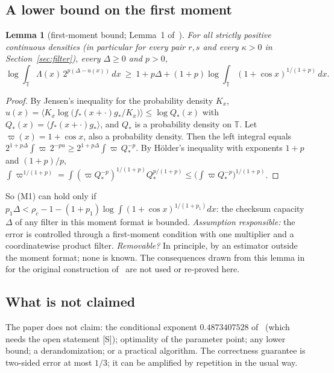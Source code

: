 \documentclass[11pt]{article}
\newtheorem{lemma}{Lemma}[section]
\theoremstyle{definition}
\newcommand{\Tc}{\mathbb T}
\newcommand{\av}[1]{\langle #1\rangle}
\begin{document}
\subsection{A lower bound on the first moment}
\begin{lemma}[first-moment bound; Lemma~1 of~\cite{V}]\label{lem:first}
For all strictly positive continuous densities (in particular for every pair $r,s$ and every $\kappa>0$ in
Section~\ref{sec:filter}), every $\Delta\ge0$ and $p>0$,
\[
 \log\int_\Tc\Lambda(x)\,2^{p(\Delta-u(x))}\,dx\ \ge\ 1+p\Delta+(1+p)\log\int_\Tc(1+\cos x)^{1/(1+p)}\,dx .
\]
\end{lemma}
\begin{proof}
By Jensen's inequality for the probability density $K_x$,
$u(x)=\av{K_x\log\bigl(f_\ast(x+\cdot)g_\ast/K_x\bigr)}\le\log Q_\ast(x)$ with $Q_\ast(x)=\av{f_\ast(x+\cdot)g_\ast}$,
and $Q_\ast$ is a probability density on $\Tc$. Let $\varpi(x)=1+\cos x$, also a probability density. Then the
left integral equals $2^{1+p\Delta}\int\varpi\,2^{-pu}\ge2^{1+p\Delta}\int\varpi\,Q_\ast^{-p}$. By H\"older's inequality
with exponents $1+p$ and $(1+p)/p$,
$\int\varpi^{1/(1+p)}=\int(\varpi Q_\ast^{-p})^{1/(1+p)}Q_\ast^{p/(1+p)}\le\bigl(\int\varpi Q_\ast^{-p}\bigr)^{1/(1+p)}$.
\end{proof}
So \textup{(M1)} can hold only if $p_1\Delta<\rho_c-1-(1+p_1)\log\int(1+\cos x)^{1/(1+p_1)}dx$: the checksum capacity
$\Delta$ of any filter in this moment format is bounded. \emph{Assumption responsible:} the error is controlled
through a first-moment condition with one multiplier and a coordinatewise product filter. \emph{Removable?} In
principle, by an estimator outside the moment format; none is known. The consequences drawn from this lemma
in~\cite{V} for the original construction of~\cite{OAI} are not used or re-proved here.

\subsection{What is not claimed}
The paper does not claim: the conditional exponent $0.4873407528$ of~\cite{V} (which needs the open statement
\textup{[S]}); optimality of the parameter point; any lower bound; a derandomization; or a practical algorithm. The
correctness guarantee is two-sided error at most $1/3$; it can be amplified by repetition in the usual way.
\end{document}
